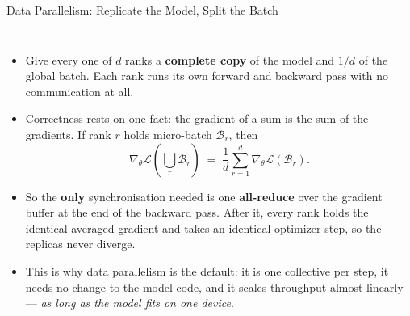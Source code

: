 \begin{frame}{Data Parallelism: Replicate the Model, Split the Batch}
  \begin{columns}[T,onlytextwidth]
      \begin{itemize}\footnotesize\itemsep0.35em
        \item[\textcolor{red}{$\blacktriangleright$}] Give every one of $d$ ranks a \textbf{complete copy} of the model and $1/d$ of the global batch. Each rank runs its own forward and backward pass with no communication at all.
        \item[\textcolor{red}{$\blacktriangleright$}] Correctness rests on one fact: the gradient of a sum is the sum of the gradients. If rank $r$ holds micro-batch $\mathcal{B}_r$, then
          \[
            \nabla_\theta \mathcal{L}\!\left(\textstyle\bigcup_r \mathcal{B}_r\right)
            \;=\; \frac{1}{d}\sum_{r=1}^{d} \nabla_\theta \mathcal{L}(\mathcal{B}_r).
          \]
        \item[\textcolor{red}{$\blacktriangleright$}] So the \textbf{only} synchronisation needed is one \textbf{all-reduce} over the gradient buffer at the end of the backward pass. After it, every rank holds the identical averaged gradient and takes an identical optimizer step, so the replicas never diverge.
        \item[\textcolor{red}{$\blacktriangleright$}] This is why data parallelism is the default: it is one collective per step, it needs no change to the model code, and it scales throughput almost linearly --- \emph{as long as the model fits on one device}.
      \end{itemize}
      \centering
      \vspace{0.9em}
  \end{columns}
\end{frame}

